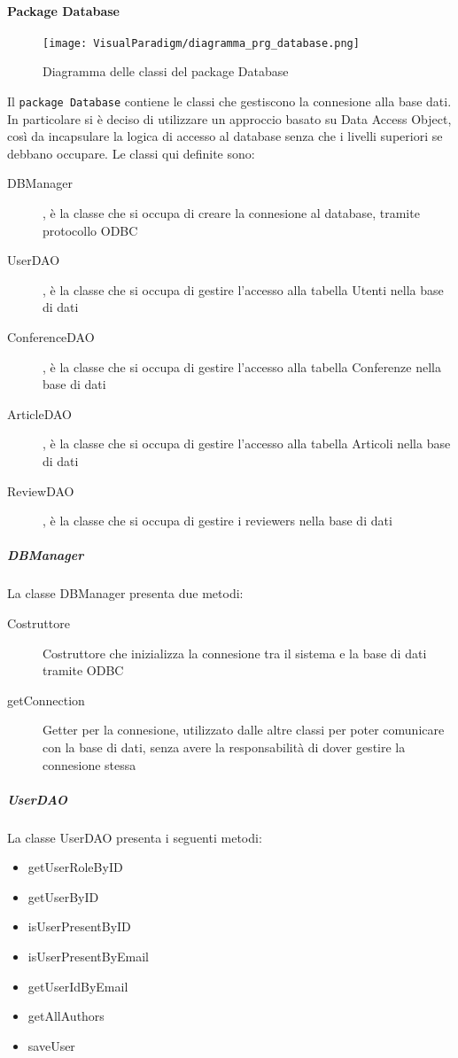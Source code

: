 \paragraph{Package Database}
\begin{figure}[ht]
  \centering
  \texttt{[image: VisualParadigm/diagramma\_prg\_database.png]}
  \caption{Diagramma delle classi del package Database}
  \label{fig:package_database}
\end{figure}

Il \texttt{package Database} contiene le classi che gestiscono la connesione
alla base dati. In particolare si è deciso di utilizzare un approccio basato
su Data Access Object, così da incapsulare la logica di accesso al database
senza che i livelli superiori se debbano occupare.
Le classi qui definite sono:
\begin{description}
\item[DBManager], è la classe che si occupa di creare la connesione al database, tramite protocollo ODBC
\item[UserDAO], è la classe che si occupa di gestire l'accesso alla tabella Utenti nella base di dati
\item[ConferenceDAO], è la classe che si occupa di gestire l'accesso alla tabella Conferenze nella base di dati
\item[ArticleDAO], è la classe che si occupa di gestire l'accesso alla tabella Articoli nella base di dati
\item[ReviewDAO], è la classe che si occupa di gestire i reviewers nella base di dati
\end{description}

\subparagraph{DBManager}
La classe DBManager presenta due metodi:
\begin{description}
\item[Costruttore] Costruttore che inizializza la connesione tra il sistema e la base di dati tramite ODBC
\item[getConnection] Getter per la connesione, utilizzato dalle altre classi
  per poter comunicare con la base di dati, senza avere la responsabilità di
  dover gestire la connesione stessa
\end{description}

\subparagraph{UserDAO}
La classe UserDAO presenta i seguenti metodi:
\begin{itemize}
\item getUserRoleByID
\item getUserByID
\item isUserPresentByID
\item isUserPresentByEmail
\item getUserIdByEmail
\item getAllAuthors
\item saveUser
\end{itemize}

